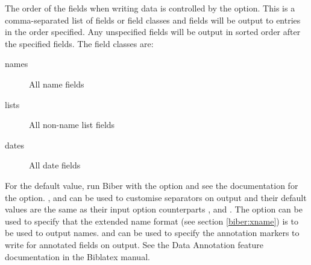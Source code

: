 \documentclass{ltxdockit}
\newcommand*{\biber}{Biber\xspace}
\newcommand*{\biblatex}{Biblatex\xspace}
\begin{document}
The order of the fields when writing \bibtex data is controlled by the
 option. This is a comma-separated list of fields
or field classes and fields will be output to entries in the order
specified. Any unspecified fields will be output in sorted order after the
specified fields. The field classes are:

\begin{description}
\item[names] All name fields
\item[lists] All non-name list fields
\item[dates] All date fields
\end{description}
%
For the default value, run \biber with the  option and see the
documentation for the option. , 
and  can be used to customise separators on output and
their default values are the same as their input option counterparts
,  and . The option
 can be used to specify that the extended name format
(see section \ref{biber:xname}) is to be used to output names.
 and  can
be used to specify the annotation markers to write for annotated fields on
output. See the Data Annotation feature documentation in the \biblatex
manual.
\end{document}
